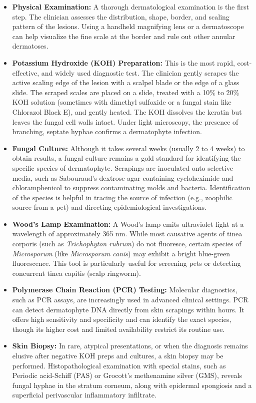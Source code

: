 \begin{itemize}
    \item \textbf{Physical Examination:} A thorough dermatological examination is the first step. The clinician assesses the distribution, shape, border, and scaling pattern of the lesions. Using a handheld magnifying lens or a dermatoscope can help visualize the fine scale at the border and rule out other annular dermatoses.
    \item \textbf{Potassium Hydroxide (KOH) Preparation:} This is the most rapid, cost-effective, and widely used diagnostic test. The clinician gently scrapes the active scaling edge of the lesion with a scalpel blade or the edge of a glass slide. The scraped scales are placed on a slide, treated with a 10\% to 20\% KOH solution (sometimes with dimethyl sulfoxide or a fungal stain like Chlorazol Black E), and gently heated. The KOH dissolves the keratin but leaves the fungal cell walls intact. Under light microscopy, the presence of branching, septate hyphae confirms a dermatophyte infection.
    \item \textbf{Fungal Culture:} Although it takes several weeks (usually 2 to 4 weeks) to obtain results, a fungal culture remains a gold standard for identifying the specific species of dermatophyte. Scrapings are inoculated onto selective media, such as Sabouraud's dextrose agar containing cycloheximide and chloramphenicol to suppress contaminating molds and bacteria. Identification of the species is helpful in tracing the source of infection (e.g., zoophilic source from a pet) and directing epidemiological investigations.
    \item \textbf{Wood's Lamp Examination:} A Wood's lamp emits ultraviolet light at a wavelength of approximately 365 nm. While most causative agents of tinea corporis (such as \textit{Trichophyton rubrum}) do not fluoresce, certain species of \textit{Microsporum} (like \textit{Microsporum canis}) may exhibit a bright blue-green fluorescence. This tool is particularly useful for screening pets or detecting concurrent tinea capitis (scalp ringworm).
    \item \textbf{Polymerase Chain Reaction (PCR) Testing:} Molecular diagnostics, such as PCR assays, are increasingly used in advanced clinical settings. PCR can detect dermatophyte DNA directly from skin scrapings within hours. It offers high sensitivity and specificity and can identify the exact species, though its higher cost and limited availability restrict its routine use.
    \item \textbf{Skin Biopsy:} In rare, atypical presentations, or when the diagnosis remains elusive after negative KOH preps and cultures, a skin biopsy may be performed. Histopathological examination with special stains, such as Periodic acid-Schiff (PAS) or Grocott's methenamine silver (GMS), reveals fungal hyphae in the stratum corneum, along with epidermal spongiosis and a superficial perivascular inflammatory infiltrate.
\end{itemize}

